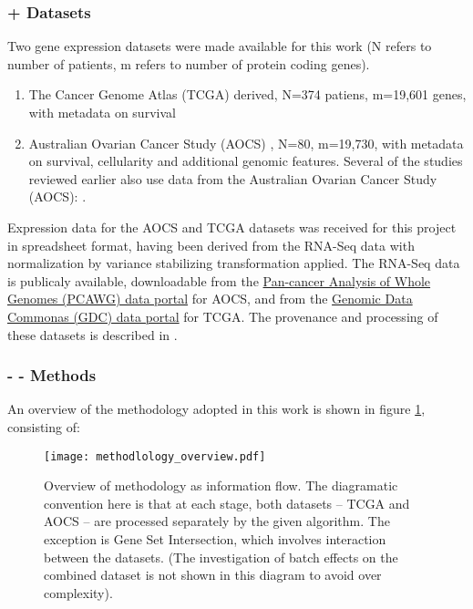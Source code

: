 \documentclass[tikz, 11pt,a4paper,oneside,fleqn, draft]{article}
\begin{document}
\subsubsection{+ Datasets}
Two gene expression datasets were made available for this work (N refers to number of patients, m refers to number of protein coding genes).
\begin{enumerate}
\item The Cancer Genome Atlas (TCGA) derived, N=374 patiens, m=19,601 genes, with metadata on survival
\item Australian Ovarian Cancer Study (AOCS) \cite{Patch2015}, N=80, m=19,730, with metadata on survival, cellularity and additional genomic features. Several of the studies reviewed earlier also use data from the Australian Ovarian Cancer Study (AOCS): \cite{Patch2015,Ewing2020,Cuello2018,Au-Yeung2014}.
\end{enumerate}

Expression data for the AOCS and TCGA datasets was received for this project in spreadsheet format, having been derived from the RNA-Seq data with normalization by variance stabilizing transformation applied.  The RNA-Seq data is publicaly available, downloadable from  the \href{https://dcc.icgc.org/pcawg}{Pan-cancer Analysis of Whole Genomes (PCAWG) data portal} for AOCS, and from the \href{https://portal.gdc.cancer.gov/}{Genomic Data Commonas (GDC) data portal} for TCGA.  The provenance and processing of these datasets is described in \cite{Ewing2020}.


\subsubsection{- - Methods}
An overview of the methodology adopted in this work is shown in figure \ref{fig-method-overview}, consisting of:

\begin{figure}[htb!]
\begin{center}
\texttt{[image: methodlology\_overview.pdf]}
\end{center}
\caption{Overview of methodology as information flow.  The diagramatic convention here is that at each stage, both datasets -- TCGA and AOCS -- are processed separately by the given algorithm.  The exception is Gene Set Intersection, which involves interaction between the datasets.  (The investigation of batch effects on the combined dataset is not shown in this diagram to avoid over complexity). }
\label{fig-method-overview}
\end{figure}
\end{document}
